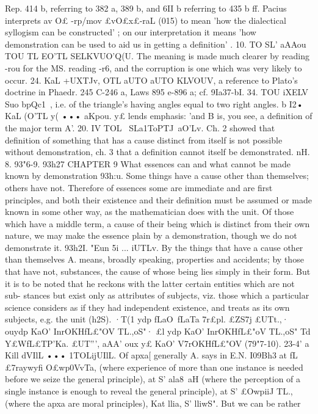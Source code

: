 {{{{{{{{{{{{{{{{{{{{{{{{{{{{{{{Rep. 414 b, referring to 382 a, 389 b, and 6II b referring to 435 b ff.
Pacius interprets av O£ -rp/mov £vO£x£-raL (015) to mean 'how the
dialectical syllogism can be constructed' ; on our interpretation it
means 'how demonstration can be used to aid us in getting a
definition' .
10. TO SL' aAAou TOU TL EO'TL SELKVUO'Q(U. The meaning is made
much clearer by reading -rou for the MS. reading -r6, and the
corruption is one which was very likely to occur.
24. KaL +UXTJv, OTL aUTO aUTO KLVOUV, a reference to Plato's
doctrine in Phaedr. 245 C-246 a, Laws 895 e-896 a; cf. 9Ia37-bI.
34. TOU iXELV Suo bpQc1~, i.e. of the triangle's having angles
equal to two right angles.
b I2• KaL (O'TL y( ••• aKpou. y£ lends emphasis: 'and B is, you
see, a definition of the major term A'.
20. IV TOL~ SLa1ToPTJ~aO'Lv. Ch. 2 showed that definition of
something that has a cause distinct from itself is not possible
without demonstration, ch. 3 that a definition cannot itself be
demonstrated.
nH. 8. 93"6-9. 93h27
CHAPTER 9
What essences can and what cannot be made known by demonstration
93h:u. Some things have a cause other than themselves;
others have not. Therefore of essences some are immediate and
are first principles, and both their existence and their definition
must be assumed or made known in some other way, as the
mathematician does with the unit. Of those which have a middle
term, a cause of their being which is distinct from their own
nature, we may make the essence plain by a demonstration,
though we do not demonstrate it.
93h2I. "Eun 5i ... iUTLv. By the things that have a cause
other than themselves A. means, broadly speaking, properties
and accidents; by those that have not, substances, the cause of
whose being lies simply in their form. But it is to be noted that
he reckons with the latter certain entities which are not sub-
stances but exist only as attributes of subjects, viz. those which
a particular science considers as if they had independent existence,
and treats as its own subjects, e.g. the unit (h2S). ·T(1 ydp fLaO~fLaTa
7r£pl. £ZS7j £UTt.,· ouydp KaO' InrOKHfL£"OV TL.,oS"· £l ydp KaO' InrOKHfL£"oV
TL.,oS" Td Y£WfL£TP'Ka. £UT''', aAA' oux y£ KaO' V7rOKHfL£"OV (79"7-10).
23-4' a Kill dVIlL ••• 1TOLijUIlL. Of apxa[ generally A. says in
E.N. I09Bh3 at fL~ £7raywyfi O£wp0VvTa, (where experience of more
than one instance is needed before we seize the general principle),
at S' ala8~aH (where the perception of a single instance is enough
to reveal the general principle), at S' £OwpiiJ TL.,{ (where the apxa{
are moral principles), Kat llia, S' lliwS". But we can be rather
}}}}}}}}}}}}}}}}}}}}}}}}}}}}}}}}}
